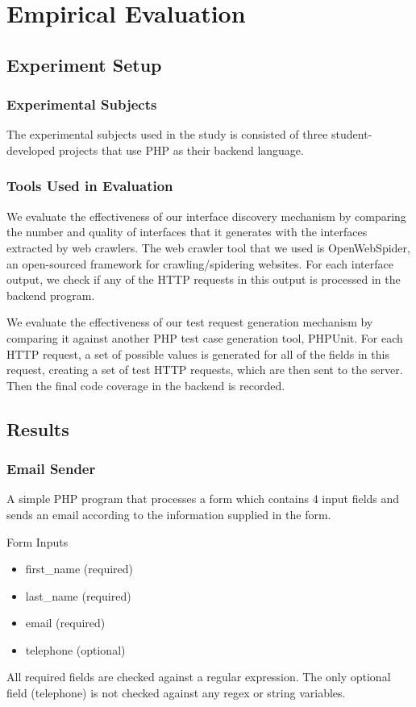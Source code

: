 \chapter{Empirical Evaluation}

\section{Experiment Setup}
\subsection{Experimental Subjects}
The experimental subjects used in the study is consisted of three student-developed projects that use PHP as their backend language.

\subsection{Tools Used in Evaluation}
We evaluate the effectiveness of our interface discovery mechanism by comparing the number and quality of interfaces that it generates with the interfaces extracted by web crawlers. The web crawler tool that we used is OpenWebSpider, an open-sourced framework for crawling/spidering websites. For each interface output, we check if any of the HTTP requests in this output is processed in the backend program.

We evaluate the effectiveness of our test request generation mechanism by comparing it against another PHP test case generation tool, PHPUnit. For each HTTP request, a set of possible values is generated for all of the fields in this request, creating a set of test HTTP requests, which are then sent to the server. Then the final code coverage in the backend is recorded.

\section{Results}

\subsection{Email Sender}
A simple PHP program that processes a form which contains 4 input fields and sends an email according to the information supplied in the form. 

Form Inputs
\begin{itemize}
\item first\_name (required)
\item last\_name (required)
\item email (required)
\item telephone (optional)
\end{itemize}
All required fields are checked against a regular expression. The only optional field (telephone) is not checked against any regex or string variables.

